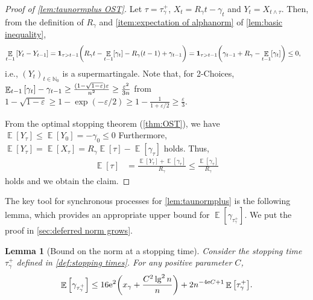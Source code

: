\documentclass[letterpaper,11pt]{article}
\newtheorem{lemma}[theorem]{Lemma}
\newcommand{\indicator}{\mathbf{1}}
\DeclareMathOperator*{\E}{\mathbb{E}}
\renewcommand{\epsilon}{\varepsilon}
\newcommand{\e}{\mathrm{e}}
\newcommand{\Nat}{\mathbb{N}}
\newcommand{\alphanorm}{\gamma}
\newcommand{\taunormplus}{\tau^{+}_{\alphanorm}}
\newcommand{\drift}{R}
\newcommand{\xnorm}{x_{\alphanorm}}
\newcommand{\driftnorm}{\drift_{\alphanorm}}
\begin{document}
\begin{proof}[Proof of \cref{lem:taunormplus OST}]
    Let $\tau=\taunormplus$, $X_t=\driftnorm t-\alphanorm_t$ and $Y_t=X_{t\wedge \tau}$.
    Then, from the definition of $\driftnorm$ and \cref{item:expectation of alphanorm} of \cref{lem:basic inequality},
    \begin{align*}
    \E_{t-1}\qty[Y_t-Y_{t-1}]
    &=\indicator_{\tau>t-1}\qty(\driftnorm t-\E_{t-1}[\alphanorm_t]-\driftnorm (t-1)+\alphanorm_{t-1})
    =\indicator_{\tau>t-1}\qty(\alphanorm_{t-1}+\driftnorm-\E_{t-1}[\alphanorm_t])
    \leq 0,
    \end{align*}
    i.e., $(Y_t)_{t\in \Nat_0}$ is a supermartingale.
    Note that, for 2-Choices, 
    $\E_{t-1}\qty[\alphanorm_t]-\alphanorm_{t-1}\geq \frac{(1-\sqrt{1-\epsilon})\epsilon}{n^2}\geq \frac{\epsilon^2}{3n}$ from $1-\sqrt{1-\varepsilon}\geq 1-\exp(-\varepsilon/2) \geq 1-\frac{1}{1+\varepsilon/2}\geq \frac{\varepsilon}{3}$.
    
    From the optimal stopping theorem (\cref{thm:OST}), we have $\E[Y_\tau]\leq \E[Y_0]=-\alphanorm_0\leq 0$ 
    Furthermore, $\E[Y_\tau]=\E[X_\tau]=\driftnorm \E[\tau]-\E[\alphanorm_\tau]$ holds.
    Thus, 
    \begin{align*}
        \E[\tau]&=\frac{\E[Y_\tau]+\E[\alphanorm_\tau]}{\driftnorm}
        \leq \frac{\E[\alphanorm_\tau]}{\driftnorm}
    \end{align*}
    holds and we obtain the claim.
\end{proof}
The key tool for synchronous processes for \cref{lem:taunormplus} is the following lemma, which provides an appropriate upper bound for $\E[\alphanorm_{\taunormplus}]$.
We put the proof in \cref{sec:deferred norm grows}.
\begin{lemma}[Bound on the norm at a stopping time]
    \label{lem:taunormplus expectation of norm}
    Consider the stopping time $\taunormplus$ defined in \cref{def:stopping times}.
    For any positive parameter $C$, 
    \begin{align*}
        \E\qty[\alphanorm_{\taunormplus}]\leq 
        16\e^2\qty(\xnorm+\frac{C^2\lg^2n}{n})+2n^{-4\e C+1}\E\qty[\taunormplus].
    \end{align*}
\end{lemma}
%
\end{document}
